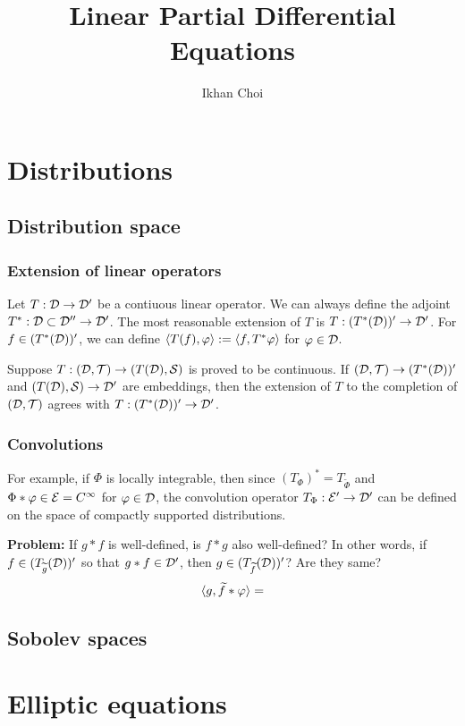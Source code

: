 \documentclass{../note}
\begin{document}
\title{Linear Partial Differential Equations}
\author{Ikhan Choi}
\maketitle
\tableofcontents


\part{Distributions}
\chapter{Distribution space}


\section{Extension of linear operators}
Let $T:\mathcal{D}\to\mathcal{D}'$ be a contiuous linear operator.
We can always define the adjoint $T^*:\mathcal{D}\subset\mathcal{D}''\to\mathcal{D}'$.
The most reasonable extension of $T$ is $T:(T^*(\mathcal{D}))'\to\mathcal{D}'$.
For $f\in(T^*(\mathcal{D}))'$, we can define $\langle T(f),\varphi\rangle:=\langle f,T^*\varphi\rangle$ for $\varphi\in\mathcal{D}$.

Suppose $T:(\mathcal{D},\mathcal{T})\to(T(\mathcal{D}),\mathcal{S})$ is proved to be continuous.
If $(\mathcal{D},\mathcal{T})\to(T^*(\mathcal{D}))'$ and $(T(\mathcal{D}),\mathcal{S})\to\mathcal{D}'$ are embeddings, then the extension of $T$ to the completion of $(\mathcal{D},\mathcal{T})$ agrees with $T:(T^*(\mathcal{D}))'\to\mathcal{D}'$.

\section{Convolutions}
For example, if $\Phi$ is locally integrable, then since $(T_\Phi)^*=T_{\tilde\Phi}$ and $\Phi*\varphi\in\mathcal{E}=C^\infty$ for $\varphi\in\mathcal{D}$, the convolution operator $T_\Phi:\mathcal{E}'\to\mathcal{D}'$ can be defined on the space of compactly supported distributions.

\textbf{Problem:}
If $g*f$ is well-defined, is $f*g$ also well-defined?
In other words, if $f\in(T_{\widetilde g}(\mathcal{D}))'$ so that $g*f\in\mathcal{D}'$, then $g\in(T_{\widetilde f}(\mathcal{D}))'$? Are they same?
\[\langle g,\widetilde f*\varphi\rangle=\]

\chapter{Sobolev spaces}








\part{Elliptic equations}
\end{document}
